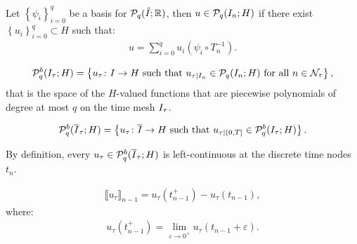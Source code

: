 Let $\left\{ \psi_i \right\}_{i = 0}^q$ be a basis for $\mathcal{P}_{q}(\hat{I}; \mathbb{R})$, then $u \in \mathcal{P}_{q}(I_n; H)$ if there exist $\left\{ u_i \right\}_{i = 0}^q \subset H$ such that:
\begin{align} %
    u = \sum_{i = 0}^q u_i (\psi_i \circ T_n^{-1}).
\end{align}

\begin{definition}
    \begin{align}
        \mathcal{P}_{q}^b(I_{\tau}; H) = \left\{ u_{\tau} \colon I \rightarrow H \text{ such that } u_{\tau \mid I_n} \in \mathcal{P}_{q}(I_n; H) \text{ for all } n \in \mathcal{N}_{\tau} \right\},
    \end{align}
    that is the space of the $H$-valued functions that are piecewise polynomials of degree at most $q$ on the time mesh $I_{\tau}$.
\end{definition}

\begin{definition}
    \begin{align}
        \mathcal{P}_{q}^b(\overline{I}_{\tau}; H) = \left\{ u_{\tau} \colon \overline{I} \rightarrow H \text{ such that } u_{\tau \mid (0, T]} \in \mathcal{P}_{q}^b(I_{\tau}; H) \right\}.
    \end{align}
\end{definition}


By definition, every $u_{\tau} \in \mathcal{P}_{q}^b(\overline{I}_{\tau}; H)$ is left-continuous at the discrete time nodes $t_n$.

\begin{definition} \label{def:time_jumps}
    \begin{align}
        \llbracket u_{\tau} \rrbracket_{n - 1} = u_{\tau}(t_{n - 1}^+) - u_{\tau}(t_{n - 1}),
    \end{align}
    where:
    \begin{align}
        u_{\tau}(t_{n - 1}^+) = \lim_{\varepsilon \rightarrow 0^+} u_{\tau}(t_{n - 1} + \varepsilon).
    \end{align}
\end{definition}


